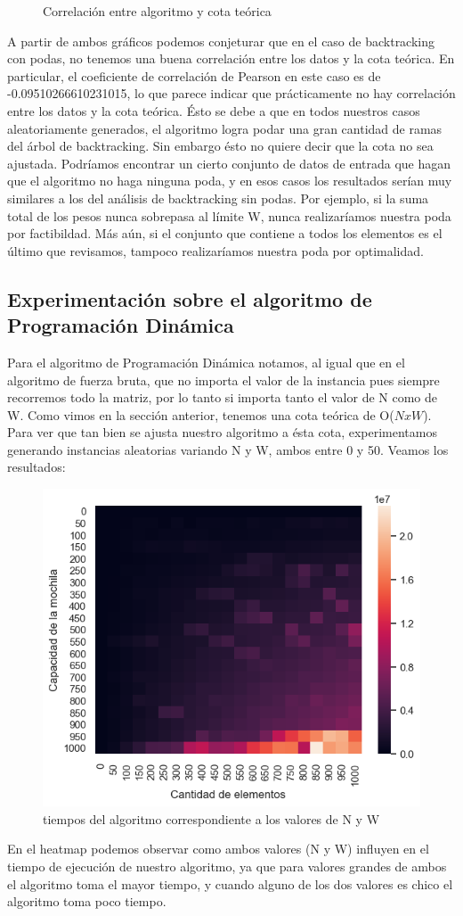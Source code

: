 \begin{figure}[H]
\begin{minipage}{0.5\textwidth}
     \caption{Correlación entre algoritmo y cota teórica}
   \end{minipage}
\end{figure}

A partir de ambos gráficos podemos conjeturar que en el caso de backtracking con podas, no tenemos una buena correlación entre los datos y la cota teórica. En particular, el coeficiente de correlación de Pearson en este caso es de -0.09510266610231015, lo que parece indicar que prácticamente no hay correlación entre los datos y la cota teórica. Ésto se debe a que en todos nuestros casos aleatoriamente generados, el algoritmo logra podar una gran cantidad de ramas del árbol de backtracking. Sin embargo ésto no quiere decir que la cota no sea ajustada. Podríamos encontrar un cierto conjunto de datos de entrada que hagan que el algoritmo no haga ninguna poda, y en esos casos los resultados serían muy similares a los del análisis de backtracking sin podas. Por ejemplo, si la suma total de los pesos nunca sobrepasa al límite W, nunca realizaríamos nuestra poda por factibildad. Más aún, si el conjunto que contiene a todos los elementos es el último que revisamos, tampoco realizaríamos nuestra poda por optimalidad.


\subsection{Experimentación sobre el algoritmo de Programación Dinámica}
Para el algoritmo de Programación Dinámica notamos, al igual que en el algoritmo de fuerza bruta, que no importa el valor de la instancia pues siempre recorremos todo la matriz, por lo tanto si importa tanto el valor de N como de W. Como vimos en la sección anterior, tenemos una cota teórica de O($NxW$). Para ver que tan bien se ajusta nuestro algoritmo a ésta cota, experimentamos generando instancias aleatorias variando N y W, ambos entre 0 y 50. Veamos los resultados:
\begin{center}

\begin{figure}[H]
     \centering
     \includegraphics[width=0.5\linewidth]{img/heatmap}
     \caption{tiempos del algoritmo correspondiente a los valores de N y W}
\end{figure}

\end{center}
En el heatmap podemos observar como ambos valores (N y W) influyen en el tiempo de ejecución de nuestro algoritmo, ya que para valores grandes de ambos el algoritmo toma el mayor tiempo, y cuando alguno de los dos valores es chico el algoritmo toma poco tiempo.

